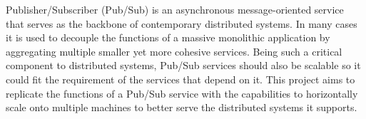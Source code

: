 Publisher/Subscriber (Pub/Sub) is an asynchronous message-oriented service that serves as the backbone of contemporary distributed systems. In many cases it is used to decouple the functions of a massive monolithic application by aggregating multiple smaller yet more cohesive services. Being such a critical component to distributed systems, Pub/Sub services should also be scalable so it could fit the requirement of the services that depend on it. This project aims to replicate the functions of a Pub/Sub service with the capabilities to horizontally scale onto multiple machines to better serve the distributed systems it supports.
